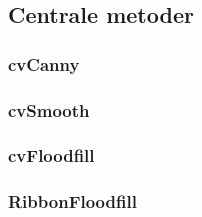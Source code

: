 {\subsection{Centrale metoder}
\subsubsection{cvCanny}
\subsubsection{cvSmooth}
\subsubsection{cvFloodfill}
\subsubsection{RibbonFloodfill}

}

